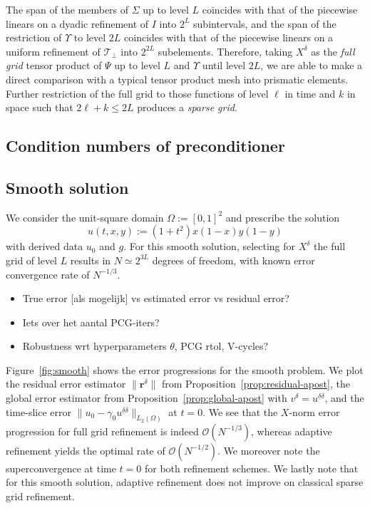 \documentclass[11pt,a4paper,oneside,english]{amsart}
\numberwithin{equation}{section}
\numberwithin{theorem}{section}
\theoremstyle{definition}
\newcommand{\T}{\mathcal{T}}
\newcommand{\udelta}{{\underline{\delta}}}
\newcommand{\jw}[1]{{\color{red}{JW: #1}}}
\begin{document}
The span of the members of $\Sigma$ up to level $L$ coincides with that of the
piecewise linears on a dyadic refinement of $I$ into $2^L$ subintervals, and the
span of the restriction of $\Upsilon$ to level $2L$ coincides with that of the
piecewise linears on a uniform refinement of $\T_\perp$ into $2^{2L}$ subelements.
Therefore, taking $X^\delta$ as the \emph{full grid} tensor product of $\Psi$ up to
level $L$ and $\Upsilon$ until level $2L$, we are able to make a direct comparison
with a typical tensor product mesh into prismatic elements. \jw{meh slecht geformuleerd}
Further restriction of the full grid to those functions of level $\ell$ in time and
$k$ in space such that $2 \ell + k \leq 2L$ produces a \emph{sparse grid}.

\subsection{Condition numbers of preconditioner}
\subsection{Smooth solution}
We consider the unit-square domain $\Omega := [0,1]^2$ and prescribe the solution
\[
  u(t,x,y) := (1 + t^2) x (1-x) y (1-y)
\]
with derived data $u_0$ and $g$. For this smooth solution, selecting for $X^\delta$
the full grid of level $L$ results in $N \simeq 2^{3L}$ degrees of freedom, with
known error convergence rate of $N^{-1/3}$.\jw{citatie}
\begin{itemize}
  \item True error [als mogelijk] vs estimated error vs residual error?
  \item Iets over het aantal PCG-iters?
  \item Robustness wrt hyperparameters $\theta$, PCG rtol, V-cycles?
\end{itemize}

Figure~\ref{fig:smooth} shows the error progressions for the smooth problem. We
plot the residual error estimator $\|\mathbf r^{\delta}\|$ from Proposition~\ref{prop:residual-apost},
the global error estimator from Proposition~\ref{prop:global-apost} with $v^\delta=u^{\udelta \delta}$,
and the time-slice error $\|u_0 - \gamma_0 u^{\udelta \delta}\|_{L_2(\Omega)}$ at $t=0$.\jw{misschien ook de $X$-norm meten?}
We see that the $X$-norm error progression for full grid refinement is indeed $\mathcal O(N^{-1/3})$,
whereas adaptive refinement yields the optimal\jw{cite} rate of $\mathcal O(N^{-1/2})$.
We moreover note the superconvergence at time $t=0$ for both refinement schemes.
We lastly note that for this smooth solution, adaptive refinement does not improve
on classical sparse grid refinement.
\end{document}
